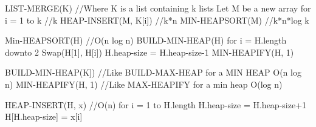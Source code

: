 LIST-MERGE(K) //Where K is a list containing k lists
	Let M be a new array
	for i = 1 to k		//k
		HEAP-INSERT(M, K[i]) //k*n
	MIN-HEAPSORT(M) //k*n*log k

Min-HEAPSORT(H) //O(n log n)
	BUILD-MIN-HEAP(H)
	for i = H.length downto 2
		Swap(H[1], H[i])
		H.heap-size = H.heap-size-1
		MIN-HEAPIFY(H, 1)
		
BUILD-MIN-HEAP(K]) //Like BUILD-MAX-HEAP for a MIN HEAP O(n log n)
MIN-HEAPIFY(H, 1) //Like MAX-HEAPIFY for a min heap O(log n)

HEAP-INSERT(H, x) //O(n)
	for i = 1 to H.length
		H.heap-size = H.heap-size+1
		H[H.heap-size] = x[i]
		

		